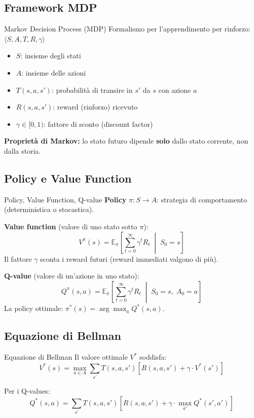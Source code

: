 \documentclass[12pt,a4paper]{article}
\begin{document}
\subsection{Framework MDP}

\begin{defbox}{Markov Decision Process (MDP)}
Formalismo per l'apprendimento per rinforzo: $\langle S, A, T, R, \gamma \rangle$
\begin{itemize}[noitemsep]
  \item $S$: insieme degli stati
  \item $A$: insieme delle azioni
  \item $T(s, a, s')$: probabilità di transire in $s'$ da $s$ con azione $a$
  \item $R(s, a, s')$: reward (rinforzo) ricevuto
  \item $\gamma \in [0,1)$: fattore di sconto (discount factor)
\end{itemize}
\textbf{Proprietà di Markov:} lo stato futuro dipende \textbf{solo} dallo stato corrente, non dalla storia.
\end{defbox}

\subsection{Policy e Value Function}

\begin{defbox}{Policy{,} Value Function{,} Q-value}
\textbf{Policy} $\pi: S \to A$: strategia di comportamento (deterministica o stocastica).

\textbf{Value function} (valore di uno stato sotto $\pi$):
\[
V^\pi(s) = \mathbb{E}_\pi\!\left[\sum_{t=0}^{\infty} \gamma^t R_t \;\middle|\; S_0 = s\right]
\]
Il fattore $\gamma$ sconta i reward futuri (reward immediati valgono di più).

\textbf{Q-value} (valore di un'azione in uno stato):
\[
Q^\pi(s, a) = \mathbb{E}_\pi\!\left[\sum_{t=0}^{\infty} \gamma^t R_t \;\middle|\; S_0 = s,\; A_0 = a\right]
\]
La policy ottimale: $\pi^*(s) = \arg\max_a Q^*(s, a)$.
\end{defbox}

\subsection{Equazione di Bellman}

\begin{formulabox}{Equazione di Bellman}
Il valore ottimale $V^*$ soddisfa:
\[
V^*(s) = \max_{a \in A} \sum_{s'} T(s, a, s') \left[ R(s, a, s') + \gamma \cdot V^*(s') \right]
\]

Per i Q-values:
\[
Q^*(s,a) = \sum_{s'} T(s,a,s') \left[ R(s,a,s') + \gamma \cdot \max_{a'} Q^*(s',a') \right]
\]
\end{formulabox}
\end{document}
